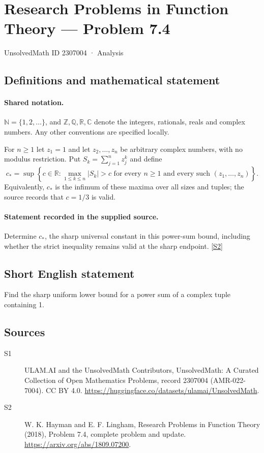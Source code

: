 \documentclass[11pt]{article}
\newcommand{\sref}[2]{\hyperlink{source:#1:#2}{[S#2]}}
\begin{document}
\setcounter{section}{2307003}
\section{Research Problems in Function Theory — Problem 7.4}\label{2307004}
{\small\sffamily UnsolvedMath ID 2307004 · Analysis}
\subsection{Definitions and mathematical statement}

\paragraph{Shared notation.}$\mathbb N=\{1,2,\ldots\}$, and $\mathbb Z,\mathbb Q,\mathbb R,\mathbb C$ denote the integers, rationals, reals and complex numbers. Any other conventions are specified locally.


For $n\geq1$ let $z_1=1$ and let $z_2,\ldots,z_n$ be arbitrary complex numbers, with no modulus restriction. Put $S_k=\sum_{j=1}^{n}z_j^k$ and define
\[c_*=\sup\left\{c\in\mathbb R:\max_{1\leq k\leq n}|S_k|>c
\text{ for every }n\geq1\text{ and every such }(z_1,\ldots,z_n)\right\}.\]
Equivalently, $c_*$ is the infimum of these maxima over all sizes and tuples; the source records that $c=1/3$ is valid.
\paragraph{Statement recorded in the supplied source.}
Determine $c_*$, the sharp universal constant in this power-sum bound, including whether the strict inequality remains valid at the sharp endpoint. \sref{2307004}{2}
\subsection{Short English statement}
Find the sharp uniform lower bound for a power sum of a complex tuple containing 1.
\subsection{Sources}
\begin{description}
\item[\hypertarget{source:2307004:1}{S1}] ULAM.AI and the UnsolvedMath Contributors, UnsolvedMath: A Curated Collection of Open Mathematics Problems, record 2307004 (AMR-022-7004). CC BY 4.0. \url{https://huggingface.co/datasets/ulamai/UnsolvedMath}.
\item[\hypertarget{source:2307004:2}{S2}] W. K. Hayman and E. F. Lingham, Research Problems in Function Theory (2018), Problem 7.4, complete problem and update. \url{https://arxiv.org/abs/1809.07200}.
\end{description}
\label{end:2307004}
\end{document}
